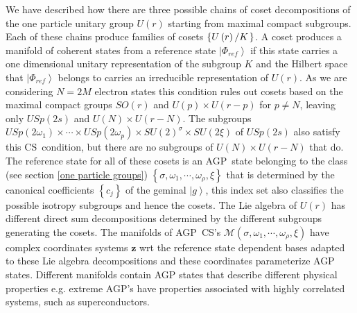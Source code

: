 \documentclass[12pt,aps,amsfonts,amssymb,tightenlines]{revtex4}%
\begin{document}
We have described how there are three possible chains of coset decompositions
of the one particle unitary group $U\left(  r\right)  $ starting from maximal
compact subgroups. Each of these chains produce families of cosets $\left\{
U\left(  r\right)  \left/  K\right.  \right\}  $. A coset produces a manifold
of coherent states from a reference state $\left\vert \Phi_{ref}\right\rangle
$ if this state carries a one dimensional unitary representation of the
subgroup $K$ and the Hilbert space that $\left\vert \Phi_{ref}\right\rangle $
belongs to carries an irreducible representation of $U\left(  r\right)  .$ As
we are considering $N=2M$ electron states this condition rules out cosets
based on the maximal compact groups $SO(r)$ and $U\left(  p\right)  \times
U\left(  r-p\right)  $ for $p\neq N$, leaving only $USp\left(  2s\right)  $
and $U\left(  N\right)  \times U\left(  r-N\right)  $. The subgroups
$USp\left(  2\omega_{1}\right)  \times\cdots\times USp\left(  2\omega
_{p}\right)  \times SU\left(  2\right)  ^{\sigma}\times SU\left(  2\xi\right)
$ of $USp\left(  2s\right)  $ also satisfy this CS\ condition, but there are
no subgroups of $U\left(  N\right)  \times U\left(  r-N\right)  $ that do. The
reference state for all of these cosets is an AGP\ state belonging to the
class (see section \ref{one particle groups}) $\left\{  \sigma,\omega
_{1},\cdots,\omega_{\rho},\xi\right\}  $ that is determined by the canonical
coefficients $\left\{  c_{j}\right\}  $ of the geminal $\left\vert
g\right\rangle $, this index set also classifies the possible isotropy
subgroups and hence the cosets. The Lie algebra of $U\left(  r\right)  $ has
different direct sum decompositions determined by the different subgroups
generating the cosets. The manifolds of AGP\ CS's $\mathcal{M}\left(
\sigma,\omega_{1},\cdots,\omega_{\rho},\xi\right)  $ have complex coordinates
systems $\mathbf{z}$ wrt the reference state dependent bases adapted to these
Lie algebra decompositions and these coordinates parameterize AGP states.
Different manifolds contain AGP states that describe different physical
properties e.g. extreme AGP's have properties associated with highly
correlated systems, such as superconductors.
\end{document}
